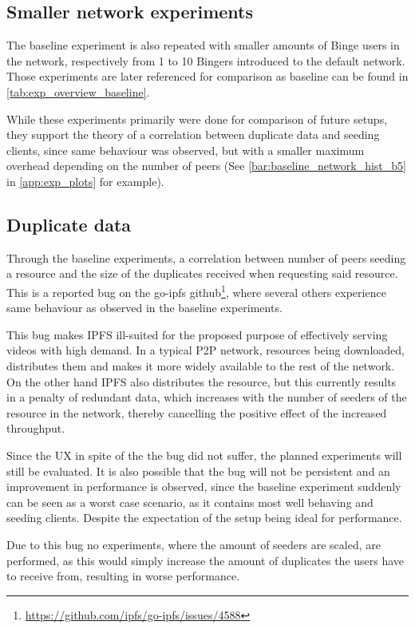 \subsection{Smaller network experiments}
The baseline experiment is also repeated with smaller amounts of Binge users in the network, respectively from 1 to 10 Bingers introduced to the default network. Those experiments are later referenced for comparison as baseline can be found in \autoref{tab:exp_overview_baseline}.

While these experiments primarily were done for comparison of future setups, they support the theory of a correlation between duplicate data and seeding clients, since same behaviour was observed, but with a smaller maximum overhead depending on the number of peers (See \autoref{bar:baseline_network_hist_b5} in \autoref{app:exp_plots} for example).

\subsection{Duplicate data}
\label{sec:eval_bug_dup}
Through the baseline experiments, a correlation between number of peers seeding a resource and the size of the duplicates received when requesting said resource. This is a reported bug on the go-ipfs github\footnote{\url{https://github.com/ipfs/go-ipfs/issues/4588}}, where several others experience same behaviour as observed in the baseline experiments.

This bug makes \ac{IPFS} ill-suited for the proposed purpose of effectively serving videos with high demand. In a typical \ac{P2P} network, resources being downloaded, distributes them and makes it more widely available to the rest of the network. On the other hand \ac{IPFS} also distributes the resource, but this currently results in a penalty of redundant data, which increases with the number of seeders of the resource in the network, thereby cancelling the positive effect of the increased throughput.

Since the \ac{UX} in spite of the the bug did not suffer, the planned experiments will still be evaluated. It is also possible that the bug will not be persistent and an improvement in performance is observed, since the baseline experiment suddenly can be seen as a worst case scenario, as it contains most well behaving and seeding clients. Despite the expectation of the setup being ideal for performance.

Due to this bug no experiments, where the amount of seeders are scaled, are performed, as this would simply increase the amount of duplicates the users have to receive from, resulting in worse performance.

